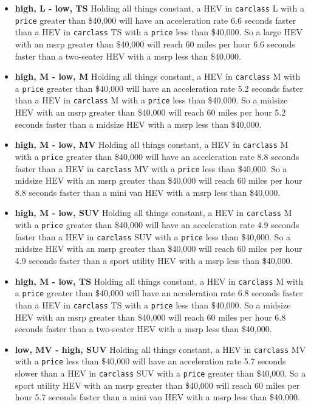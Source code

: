 \documentclass[acmsmall]{acmart}
\begin{document}
\begin{itemize}
\item[] \textbf{high, L - low, TS} Holding all things constant, a HEV in \texttt{carclass} L with a \texttt{price} greater than \$40,000 will have an acceleration rate 6.6 seconds faster than a HEV in \texttt{carclass} TS with a \texttt{price} less than \$40,000. So a large HEV with an msrp greater than \$40,000 will reach 60 miles per hour 6.6 seconds faster than a two-seater HEV with a msrp less than \$40,000.
\item[] \textbf{high, M - low, M} Holding all things constant, a HEV in \texttt{carclass} M with a \texttt{price} greater than \$40,000 will have an acceleration rate 5.2 seconds faster than a HEV in \texttt{carclass} M with a \texttt{price} less than \$40,000. So a midsize HEV with an msrp greater than \$40,000 will reach 60 miles per hour 5.2 seconds faster than a midsize HEV with a msrp less than \$40,000.
\item[] \textbf{high, M - low, MV} Holding all things constant, a HEV in \texttt{carclass} M with a \texttt{price} greater than \$40,000 will have an acceleration rate 8.8 seconds faster than a HEV in \texttt{carclass} MV with a \texttt{price} less than \$40,000. So a midsize HEV with an msrp greater than \$40,000 will reach 60 miles per hour 8.8 seconds faster than a mini van HEV with a msrp less than \$40,000.
\item[] \textbf{high, M - low, SUV} Holding all things constant, a HEV in \texttt{carclass} M with a \texttt{price} greater than \$40,000 will have an acceleration rate 4.9 seconds faster than a HEV in \texttt{carclass} SUV with a \texttt{price} less than \$40,000. So a midsize HEV with an msrp greater than \$40,000 will reach 60 miles per hour 4.9 seconds faster than a sport utility HEV with a msrp less than \$40,000.
\item[] \textbf{high, M - low, TS} Holding all things constant, a HEV in \texttt{carclass} M with a \texttt{price} greater than \$40,000 will have an acceleration rate 6.8 seconds faster than a HEV in \texttt{carclass} TS with a \texttt{price} less than \$40,000. So a midsize HEV with an msrp greater than \$40,000 will reach 60 miles per hour 6.8 seconds faster than a two-seater HEV with a msrp less than \$40,000.
\item[] \textbf{low, MV - high, SUV} Holding all things constant, a HEV in \texttt{carclass} MV with a \texttt{price} less than \$40,000 will have an acceleration rate 5.7 seconds slower than a HEV in \texttt{carclass} SUV with a \texttt{price} greater than \$40,000. So a sport utility HEV with an msrp greater than \$40,000 will reach 60 miles per hour 5.7 seconds faster than a mini van HEV with a msrp less than \$40,000.
\end{itemize}
\end{document}
